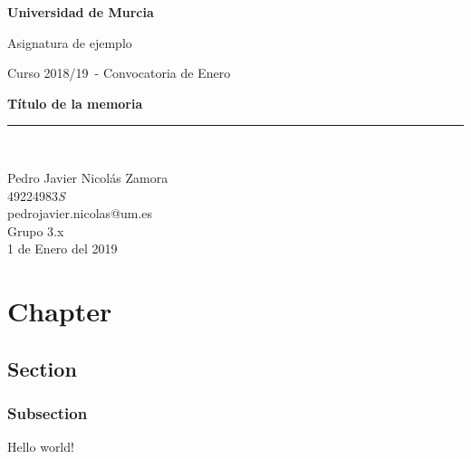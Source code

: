 \documentclass[a4paper,spanish,12pt]{report}
\title{\textitle}
\author{Pedro Javier Nicol\'as Zamora}
\newcommand{\textitle}{Título de la memoria}
\newcommand{\texsubject}{Asignatura de ejemplo}
\newcommand{\texyear}{2018/19}
\newcommand{\texmonth}{Enero}
\newcommand{\texdate}{1 de Enero del 2019}
\newcommand{\texgroup}{Grupo 3.x}
\newcommand{\cbp}[3]{}
\begin{document}

\begin{titlepage}
\begin{center}
\begin{figure}[htb]
\end{figure}
\begin{Huge}
\textbf{Universidad de Murcia}\\
\end{Huge}
\begin{huge}
\vspace{0.1cm}
\texsubject \\
\end{huge}
\begin{LARGE}
Curso \texyear\ - Convocatoria de \texmonth \\
\end{LARGE}
\vspace*{2cm}
\begin{Huge}
\textbf{\textitle} \\
\end{Huge}
\vspace*{10cm}
\rule{80mm}{0.1mm}\\
\vspace*{0.5cm}
\begin{Large}

Pedro Javier Nicolás Zamora\\
49224983\textit{S}\ \ \ \ \\
pedrojavier.nicolas@um.es\\

\vspace*{0.5cm}
\texgroup \\
\texdate \\
\end{Large}
\end{center}
\end{titlepage}

\setcounter{page}{2}

\tableofcontents
\pagebreak




%


\chapter{Chapter}
\section{Section}
\subsection{Subsection}

Hello world!
\end{document}
